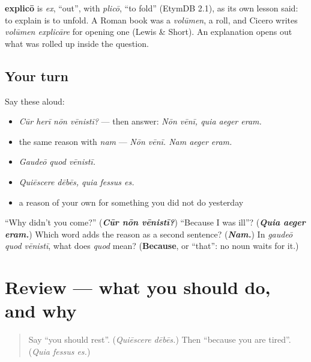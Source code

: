 \begin{cousinweb}
\textbf{explicō} is \emph{ex}, \textquotedblleft{}out\textquotedblright{}, with \emph{plicō}, \textquotedblleft{}to fold\textquotedblright{} (EtymDB 2.1), as its own lesson said: to explain is to unfold. A Roman book was a \emph{volūmen}, a roll, and Cicero writes \emph{volūmen explicāre} for opening one (Lewis \& Short). An explanation opens out what was rolled up inside the question.
\end{cousinweb}

\subsection*{Your turn}
Say these aloud:

\begin{itemize}
\raggedright
  \item \emph{Cūr herī nōn vēnistī?} — then answer: \emph{Nōn vēnī, quia aeger eram.}
  \item the same reason with \emph{nam} — \emph{Nōn vēnī. Nam aeger eram.}
  \item \emph{Gaudeō quod vēnistī.}
  \item \emph{Quiēscere dēbēs, quia fessus es.}
  \item a reason of your own for something you did not do yesterday
\end{itemize}

\begin{tcolorbox}[breakable,colback=teal!4,colframe=teal!35!black,title={Before you move on}]
\textquotedblleft{}Why didn't you come?\textquotedblright{} (\emph{\textbf{Cūr nōn vēnistī?}}) \textquotedblleft{}Because I was ill\textquotedblright{}? (\emph{\textbf{Quia aeger eram.}}) Which word adds the reason as a second sentence? (\emph{\textbf{Nam.}}) In \emph{gaudeō quod vēnistī}, what does \emph{quod} mean? (\textbf{Because}, or \textquotedblleft{}that\textquotedblright{}: no noun waits for it.)
\end{tcolorbox}
\section[(review)]{Review — what you should do, and why}

\label{lesson:LA-R284-advice-and-reasons}



\begin{quote}
Say \textquotedblleft{}you should rest\textquotedblright{}. (\emph{Quiēscere dēbēs.}) Then \textquotedblleft{}because you are tired\textquotedblright{}. (\emph{Quia fessus es.})
\end{quote}

